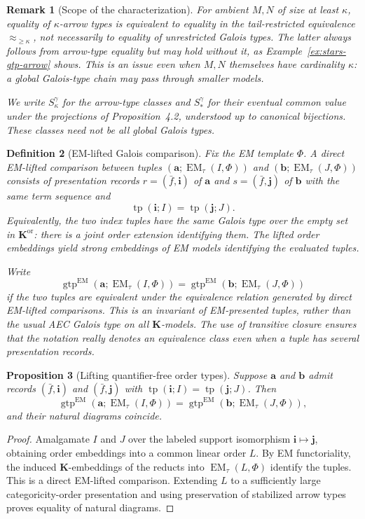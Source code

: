 \documentclass[11pt]{article}
\newcommand{\K}{\mathbf K}
\newcommand{\gtp}{\operatorname{gtp}}
\newcommand{\Kord}{\mathbf K^{\mathrm{or}}}
\newcommand{\EM}{\operatorname{EM}_{\tau}}
\newcommand{\ba}{\mathbf{a}}
\newcommand{\bb}{\mathbf{b}}
\newcommand{\bi}{\mathbf{i}}
\newcommand{\bj}{\mathbf{j}}
\theoremstyle{plain}
\newtheorem{definition}{Definition}[section]
\newtheorem{proposition}[definition]{Proposition}
\newtheorem{remark}[definition]{Remark}
\begin{document}
\begin{remark}[Scope of the characterization]
For ambient $M,N$ of size at least $\kappa$,
equality of $\kappa$-arrow types is equivalent
to equality in the \emph{tail-restricted}
equivalence $\approx_{\geq\kappa}$, not
necessarily to equality of unrestricted
Galois types. The latter always follows
from arrow-type equality but may hold without it,
as Example~\ref{ex:stars-gtp-arrow} shows.
This is an issue even when $M,N$ themselves
have cardinality $\kappa$: a global Galois-type
chain may pass through smaller models.

We write $S^\gamma_\kappa$ for the arrow-type
classes and $S^\gamma_*$ for their eventual
common value under the projections of
Proposition~4.2, understood up to canonical
bijections. These classes need not
be all global Galois types.
\end{remark}

\begin{definition}[EM-lifted Galois comparison]
Fix the EM template $\Phi$. A \emph{direct EM-lifted
comparison} between tuples $(\ba;\EM(I,\Phi))$ and
$(\bb;\EM(J,\Phi))$ consists of presentation records
$r=(\bar f,\bi)$ of $\ba$ and
$s=(\bar f,\bj)$ of $\bb$ with the same term sequence
and
\[
\operatorname{tp}(\bi;I)=\operatorname{tp}(\bj;J).
\]
Equivalently, the two index tuples have the same
Galois type over the empty set in $\Kord$:
there is a joint order extension identifying them.
The lifted order embeddings yield strong embeddings
of EM models identifying the evaluated tuples.

Write
\[
\gtp^{\mathrm{EM}}(\ba;\EM(I,\Phi))
=\gtp^{\mathrm{EM}}(\bb;\EM(J,\Phi))
\]
if the two tuples are equivalent under the
\emph{equivalence relation generated by direct
EM-lifted comparisons}. This is an invariant
of \emph{EM-presented tuples}, rather than the
usual AEC Galois type on all $\K$-models.
The use of transitive closure ensures that the
notation really denotes an equivalence class
even when a tuple has several presentation records.
\end{definition}

\begin{proposition}[Lifting quantifier-free order types]
\label{prop:order-gtpem}
Suppose $\ba$ and $\bb$ admit records
$(\bar f,\bi)$ and $(\bar f,\bj)$ with
$\operatorname{tp}(\bi;I)=\operatorname{tp}(\bj;J)$.
Then
\[
\gtp^{\mathrm{EM}}(\ba;\EM(I,\Phi))
=\gtp^{\mathrm{EM}}(\bb;\EM(J,\Phi)),
\]
and their natural diagrams coincide.
\end{proposition}
\begin{proof}
Amalgamate $I$ and $J$ over the labeled support
isomorphism $\bi\mapsto\bj$, obtaining order
embeddings into a common linear order $L$.
By EM functoriality, the induced $\K$-embeddings
of the reducts into $\EM(L,\Phi)$ identify
the tuples. This is a direct EM-lifted comparison.
Extending $L$ to a sufficiently large
categoricity-order presentation and using
preservation of stabilized arrow types proves
equality of natural diagrams.
\end{proof}
\end{document}
